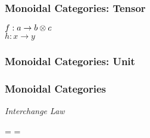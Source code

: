 \begin{frame}
    \frametitle{Monoidal Categories: Tensor}

    \begin{center}
        $f: a \to b \otimes c$ \\
        $h: x \to y$ \\ \vspace{0.5em}
    \end{center}
\end{frame}

\begin{frame}
    \frametitle{Monoidal Categories: Unit}

    \begin{center}
    \end{center}
\end{frame}

\begin{frame}
    \frametitle{Monoidal Categories}

    \begin{center}
        \textit{Interchange Law} \\ \vspace{0.5em}
        
        = 
        = 
    \end{center}
\end{frame}




